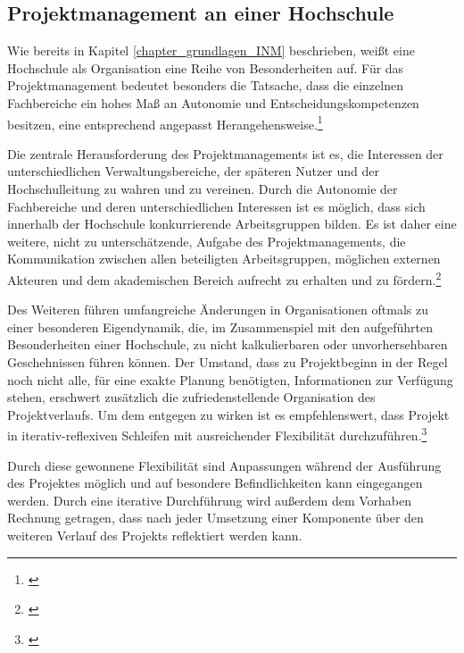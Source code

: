 
\subsection{Projektmanagement an einer Hochschule}
\label{subsection_projektmanagement_hochschule}
Wie bereits in Kapitel \ref{chapter_grundlagen_INM} beschrieben, weißt eine Hochschule als Organisation eine Reihe von Besonderheiten auf. Für das Projektmanagement bedeutet besonders die Tatsache, dass die einzelnen Fachbereiche ein hohes Maß an Autonomie und Entscheidungskompetenzen besitzen, eine entsprechend angepasst Herangehensweise.\footnote{\cite{hansen_business_2009}}

Die zentrale Herausforderung des Projektmanagements ist es, die Interessen der unterschiedlichen Verwaltungsbereiche, der späteren Nutzer und der Hochschulleitung zu wahren und zu vereinen. Durch die Autonomie der Fachbereiche und deren unterschiedlichen Interessen ist es möglich, dass sich innerhalb der Hochschule konkurrierende Arbeitsgruppen bilden. Es ist daher eine weitere, nicht zu unterschätzende, Aufgabe des Projektmanagements, die Kommunikation zwischen allen beteiligten Arbeitsgruppen, möglichen externen Akteuren und dem akademischen Bereich aufrecht zu erhalten und zu fördern.\footnote{\cite{altvater_organisation_2007}}

Des Weiteren führen umfangreiche Änderungen in Organisationen oftmals zu einer besonderen Eigendynamik, die, im Zusammenspiel mit den aufgeführten Besonderheiten einer Hochschule, zu nicht kalkulierbaren oder unvorhersehbaren Geschehnissen führen können. Der Umstand, dass zu Projektbeginn in der Regel noch nicht alle, für eine exakte Planung benötigten, Informationen zur Verfügung stehen, erschwert zusätzlich die zufriedenstellende Organisation des Projektverlaufs. Um dem entgegen zu wirken ist es empfehlenswert, dass Projekt in iterativ-reflexiven Schleifen mit ausreichender Flexibilität durchzuführen.\footnote{\cite{hansen_business_2009}}

Durch diese gewonnene Flexibilität sind Anpassungen während der Ausführung des Projektes möglich und auf besondere Befindlichkeiten kann eingegangen werden. Durch eine iterative Durchführung wird außerdem dem Vorhaben Rechnung getragen, dass nach jeder Umsetzung einer Komponente über den weiteren Verlauf des Projekts reflektiert werden kann.


